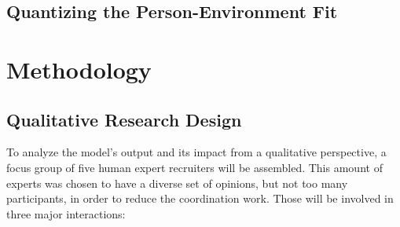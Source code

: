 \documentclass[draft,final]{thesisclass} %
\begin{document}
\section{Quantizing the Person-Environment Fit}
\lipsum[1]

\chapter{Methodology}

\section{Qualitative Research Design} \label{qualitative_research_design}
To analyze the model's output and its impact from a qualitative perspective, a focus group of five human expert recruiters will be assembled.
This amount of experts was chosen to have a diverse set of opinions, but not too many participants, in order to reduce the coordination work.
Those will be involved in three major interactions:
\end{document}
